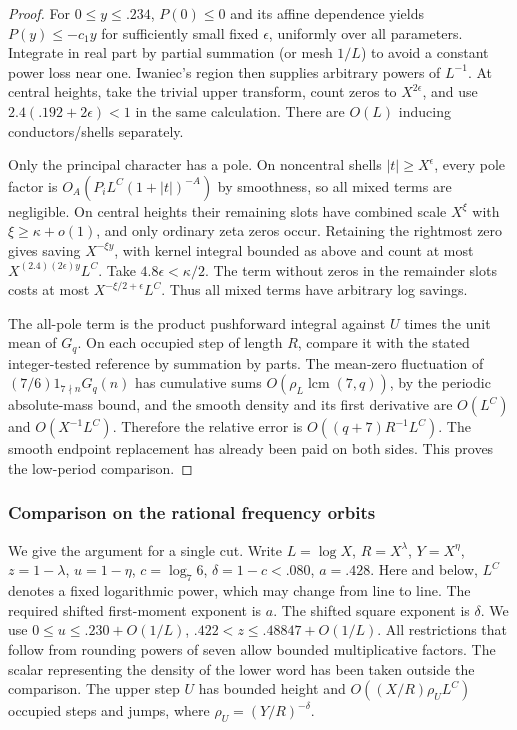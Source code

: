 \documentclass[11pt,a4paper]{article}
\theoremstyle{paperplain}
\numberwithin{equation}{section}
\begin{document}
\begin{proof}
For \(0\le y\le .234\), \(P(0)\le0\) and its affine dependence yields \(P(y)\le-c_1y\) for
sufficiently small fixed \(\epsilon\), uniformly over all parameters. Integrate in real part by
partial summation (or mesh \(1/L\)) to avoid a constant power loss near one. Iwaniec's region then
supplies arbitrary powers of \(L^{-1}\). At central heights, take the trivial upper transform,
count zeros to \(X^{2\epsilon}\), and use \(2.4(.192+2\epsilon)<1\) in the same calculation. There
are \(O(L)\) inducing conductors/shells separately.

Only the principal character has a pole. On noncentral shells \(|t|\ge X^\epsilon\), every pole
factor is \(O_A(P_i L^C(1+|t|)^{-A})\) by smoothness, so all mixed terms are negligible. On
central heights their remaining slots have combined scale \(X^\xi\) with \(\xi\ge\kappa+o(1)\),
and only ordinary zeta zeros occur. Retaining the rightmost zero gives saving \(X^{-\xi y}\), with
kernel integral bounded as above and count at most \(X^{(2.4)(2\epsilon)y}L^C\). Take
\(4.8\epsilon<\kappa/2\). The term without zeros in the remainder slots costs at most
\(X^{-\xi/2+\epsilon}L^C\). Thus all mixed terms have arbitrary log savings.

The all-pole term is the product pushforward integral against \(U\) times the unit mean of
\(G_q\). On each occupied step of length \(R\), compare it with the stated integer-tested
reference by summation by parts. The mean-zero fluctuation of \((7/6)1_{7\nmid n}G_q(n)\) has
cumulative sums \(O(\rho_L\operatorname{lcm}(7,q))\), by the periodic absolute-mass bound, and the
smooth density and its first derivative are \(O(L^C)\) and \(O(X^{-1}L^C)\). Therefore the
relative error is \(O((q+7)R^{-1}L^C)\). The smooth endpoint replacement has already been paid on
both sides. This proves the low-period comparison.

\end{proof}


\subsubsection{Comparison on the rational frequency orbits}\label{seven-orbits}

We give the argument for a single cut. Write \(L=\log X\),
\(R=X^\lambda\), \(Y=X^\eta\), \(z=1-\lambda\), \(u=1-\eta\),
\(c=\log_7 6\), \(\delta=1-c<.080\), \(a=.428\).
Here and below, \(L^C\) denotes a fixed logarithmic power, which may
change from line to line. The required shifted first-moment exponent
is \(a\). The shifted square exponent is \(\delta\).
We use \(0\le u\le .230+O(1/L)\), \(.422<z\le .48847+O(1/L)\).
All restrictions that follow from rounding powers of seven allow
bounded multiplicative factors. The scalar representing the density
of the lower word has been taken outside the comparison.
The upper step \(U\) has bounded height and \(O((X/R)\rho_U L^C)\)
occupied steps and jumps, where \(\rho_U=(Y/R)^{-\delta}\).
\end{document}
